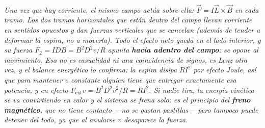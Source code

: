 \begin{center}
\begin{tikzpicture}[scale=1]
\end{tikzpicture}\\[0.5em]
{\small\itshape Una vez que hay corriente, el mismo campo actúa sobre ella:
$\vec F = I\vec L\times\vec B$ en cada tramo. Los dos tramos horizontales que
están dentro del campo llevan corriente en sentidos opuestos y dan fuerzas
verticales que se cancelan (además de tender a deformar la espira, no a
moverla). Todo el efecto neto queda en el lado interior, y su fuerza
$F_2 = I D B = B^2D^2v/R$ apunta \textbf{hacia adentro del campo}: se opone al
movimiento. Eso no es casualidad ni una coincidencia de signos, es Lenz otra
vez, y el balance energético lo confirma: la espira disipa $RI^2$ por efecto
Joule, así que para mantener $v$ constante alguien tiene que entregar
exactamente esa potencia, y en efecto $F_{\text{ext}}v = B^2D^2v^2/R = RI^2$. Si
nadie tira, la energía cinética se va convirtiendo en calor y el sistema
\emph{se frena solo}: es el principio del \textbf{freno magnético}, que no tiene
contacto ---no se gastan pastillas--- pero tampoco puede detener del todo, ya
que al anularse $v$ desaparece la fuerza.}
\end{center}
